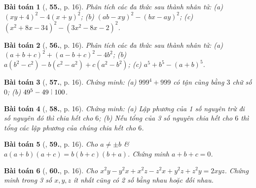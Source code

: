 \documentclass{article}
\numberwithin{equation}{section}
\newtheorem{baitoan}{Bài toán}
\DeclareRobustCommand{\divby}{%
	\mathrel{\vbox{\baselineskip.65ex\lineskiplimit0pt\hbox{.}\hbox{.}\hbox{.}}}%
}
\begin{document}
\begin{baitoan}[\cite{Tuyen_Toan_8}, \textbf{55.}, p. 16]
	Phân tích các đa thức sau thành nhân tử: (a) $(xy + 4)^2 - 4(x + y)^2$; (b) $(ab - xy)^2 - (bx - ay)^2$; (c) $(x^2 + 8x - 34)^2 - (3x^2 - 8x - 2)^2$.
\end{baitoan}

\begin{baitoan}[\cite{Tuyen_Toan_8}, \textbf{56.}, p. 16]
	Phân tích các đa thức sau thành nhân tử: (a) $(a + b + c)^2 + (a - b + c)^2 - 4b^2$; (b) $a(b^2 - c^2) - b(c^2 - a^2) + c(a^2 - b^2)$; (c) $a^5 + b^5 - (a + b)^5$.
\end{baitoan}

\begin{baitoan}[\cite{Tuyen_Toan_8}, \textbf{57.}, p. 16]
	Chứng minh: (a) $999^4 + 999$ có tận cùng bằng $3$ chữ số $0$; (b) $49^5 - 49\divby100$.
\end{baitoan}

\begin{baitoan}[\cite{Tuyen_Toan_8}, \textbf{58.}, p. 16]
	Chứng minh: (a) Lập phương của 1 số nguyên trừ đi số nguyên đó thì chia hết cho $6$; (b) Nếu tổng của 3 số nguyên chia hết cho $6$ thì tổng các lập phương của chúng chia hết cho $6$.
\end{baitoan}

\begin{baitoan}[\cite{Tuyen_Toan_8}, \textbf{59.}, p. 16]
	Cho $a\ne\pm b$ \&  $a(a + b)(a + c) = b(b + c)(b + a)$. Chứng minh $a + b + c = 0$.
\end{baitoan}

\begin{baitoan}[\cite{Tuyen_Toan_8}, \textbf{60.}, p. 16]
	Cho $x^2y - y^2x + x^2z - z^2x + y^2z + z^2y = 2xyz$. Chứng minh trong 3 số $x,y,z$ ít nhất cũng có 2 số bằng nhau hoặc đối nhau.
\end{baitoan}


\printbibliography[heading=bibintoc]
	
\end{document}
